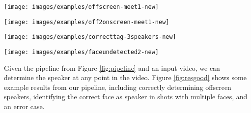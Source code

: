 \documentclass[a4paper]{article}
\begin{document}
\begin{figure*}[t]
\begin{minipage}{0.24\linewidth}
  \centering
  \centerline{\texttt{[image: images/examples/offscreen-meet1-new]}}
\end{minipage}
\hfill
\begin{minipage}{0.24\linewidth}
  \centering
  \centerline{\texttt{[image: images/examples/off2onscreen-meet1-new]}}
\end{minipage}
\hfill
\begin{minipage}{0.24\linewidth}
  \centering
  \centerline{\texttt{[image: images/examples/correcttag-3speakers-new]}}
\end{minipage}
\begin{minipage}{0.24\linewidth}
  \centering
  \centerline{\texttt{[image: images/examples/faceundetected2-new]}}
\end{minipage}
%
\caption{Exemplar results from our pipeline, with the first 3 being instances of correctly determined speakers and the last an instance of an error. A blue box around a face indicates a detected face only, while a red box indicates that that detected face was determined to be the speaker. From left to right: {\bf (a)} \& {\bf (b)} Shots from within a few frames of each other, where the system correctly determines the speaker is offscreen (leftmost image) before the shot shifts to the speaker who is correctly identified (image second from left). {\bf (c)} The speaker is correctly tagged in the presence of 2 other faces. {\bf (d)} Actual speaker is on the far left, and the combination of a small number of pixels and tilted face pose resulted in the speaker's face not being detected.}
\label{fig:resgood}
\end{figure*}


Given the pipeline from Figure \ref{fig:pipeline} and an input video, we can determine the speaker at any point in the video. Figure \ref{fig:resgood} shows some example results from our pipeline, including correctly determining offscreen speakers, identifying the correct face as speaker in shots with multiple faces, and an error case. 
\end{document}
